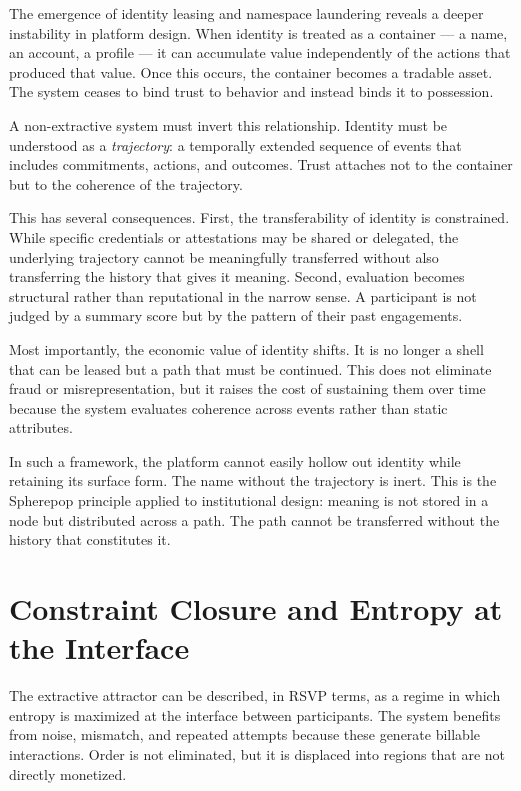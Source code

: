 \documentclass[12pt, a4paper]{article}
\begin{document}
The emergence of identity leasing and namespace laundering reveals a deeper
instability in platform design. When identity is treated as a container --- a
name, an account, a profile --- it can accumulate value independently of the
actions that produced that value. Once this occurs, the container becomes a
tradable asset. The system ceases to bind trust to behavior and instead binds
it to possession.

A non-extractive system must invert this relationship. Identity must be
understood as a \emph{trajectory}: a temporally extended sequence of events
that includes commitments, actions, and outcomes. Trust attaches not to the
container but to the coherence of the trajectory.

This has several consequences. First, the transferability of identity is
constrained. While specific credentials or attestations may be shared or
delegated, the underlying trajectory cannot be meaningfully transferred without
also transferring the history that gives it meaning. Second, evaluation becomes
structural rather than reputational in the narrow sense. A participant is not
judged by a summary score but by the pattern of their past engagements.

Most importantly, the economic value of identity shifts. It is no longer a shell
that can be leased but a path that must be continued. This does not eliminate
fraud or misrepresentation, but it raises the cost of sustaining them over time
because the system evaluates coherence across events rather than static
attributes.

In such a framework, the platform cannot easily hollow out identity while
retaining its surface form. The name without the trajectory is inert. This
is the Spherepop principle applied to institutional design: meaning is not
stored in a node but distributed across a path. The path cannot be
transferred without the history that constitutes it.

\section{Constraint Closure and Entropy at the Interface}

The extractive attractor can be described, in RSVP terms, as a regime in which
entropy is maximized at the interface between participants. The system
benefits from noise, mismatch, and repeated attempts because these generate
billable interactions. Order is not eliminated, but it is displaced into regions
that are not directly monetized.
\end{document}
